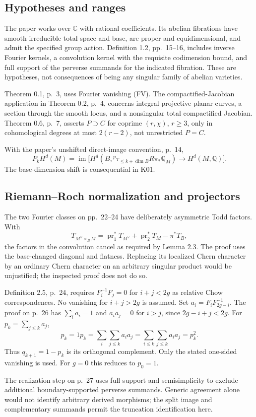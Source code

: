 \documentclass[10pt]{article}
\begin{document}
\subsection*{Hypotheses and ranges}
The paper works over \(\mathbb C\) with rational coefficients. Its abelian fibrations have smooth irreducible total space and base, are proper and equidimensional, and admit the specified group action. Definition 1.2, pp. 15–16, includes inverse Fourier kernels, a convolution kernel with the requisite codimension bound, and full support of the perverse summands for the indicated fibration. These are hypotheses, not consequences of being any singular family of abelian varieties.\par
Theorem 0.1, p. 3, uses Fourier vanishing (FV). The compactified-Jacobian application in Theorem 0.2, p. 4, concerns integral projective planar curves, a section through the smooth locus, and a nonsingular total compactified Jacobian. Theorem 0.6, p. 7, asserts \(P\supset C\) for coprime \((r,\chi)\), \(r\geq3\), only in cohomological degrees at most \(2(r-2)\), not unrestricted \(P=C\).\par
With the paper’s unshifted direct-image convention, p. 14, \[P_kH^d(M)=\operatorname{im}\bigl[
 H^d(B,{}^p\tau_{\leq k+\dim B}R\pi_*\mathbb Q_M)\longrightarrow H^d(M,\mathbb Q)\bigr].\] The base-dimension shift is consequential in K01.\par
\subsection*{Riemann–Roch normalization and projectors}
The two Fourier classes on pp. 22–24 have deliberately asymmetric Todd factors. With \[T_{M^\vee\times_B M}
 =\operatorname{pr}_1^*T_{M^\vee}+\operatorname{pr}_2^*T_M-\pi^*T_B,\] the factors in the convolution cancel as required by Lemma 2.3. The proof uses the base-changed diagonal and flatness. Replacing its localized Chern character by an ordinary Chern character on an arbitrary singular product would be unjustified; the inspected proof does not do so.\par
Definition 2.5, p. 24, requires \(F_i^{-1}F_j=0\) for \(i+j<2g\) as relative Chow correspondences. No vanishing for \(i+j>2g\) is assumed. Set \(a_i=F_iF^{-1}_{2g-i}\). The proof on p. 26 has \(\sum_i a_i=1\) and \(a_i a_j=0\) for \(i>j\), since \(2g-i+j<2g\). For \(p_k=\sum_{j\leq k}a_j\), \[p_k=1p_k=\sum_i\sum_{j\leq k}a_i a_j
       =\sum_{i\leq k}\sum_{j\leq k}a_i a_j=p_k^2 .\] Thus \(q_{k+1}=1-p_k\) is its orthogonal complement. Only the stated one-sided vanishing is used. For \(g=0\) this reduces to \(p_0=1\).\par
The realization step on p. 27 uses full support and semisimplicity to exclude additional boundary-supported perverse summands. Generic agreement alone would not identify arbitrary derived morphisms; the split image and complementary summands permit the truncation identification here.\par
\end{document}

